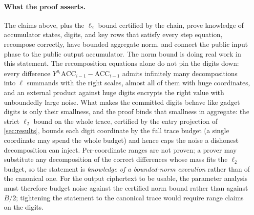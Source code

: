 \documentclass[11pt]{article}
\newcommand{\ACC}{\mathrm{ACC}}
\begin{document}
\paragraph{What the proof asserts.} The claims above, plus the $\ell_2$ bound certified by the chain, prove knowledge of accumulator states, digits, and key rows that satisfy every step equation, recompose correctly, have bounded aggregate norm, and connect the public input phase to the public output accumulator. The norm bound is doing real work in this statement. The recomposition equations alone do not pin the digits down: every difference $Y^{\tilde a_i}\ACC_{i-1} - \ACC_{i-1}$ admits infinitely many decompositions into $\ell$ summands with the right scales, almost all of them with huge coordinates, and an external product against huge digits encrypts the right value with unboundedly large noise. What makes the committed digits behave like gadget digits is only their smallness, and the proof binds that smallness in aggregate: the strict $\ell_2$ bound on the whole trace, certified by the entry projection of \cref{sec:results}, bounds each digit coordinate by the full trace budget (a single coordinate may spend the whole budget) and hence caps the noise a dishonest decomposition can inject. Per-coordinate ranges are not proven; a prover may substitute any decomposition of the correct differences whose mass fits the $\ell_2$ budget, so the statement is \emph{knowledge of a bounded-norm execution} rather than of the canonical one. For the output ciphertext to be usable, the parameter analysis must therefore budget noise against the certified norm bound rather than against $B/2$; tightening the statement to the canonical trace would require range claims on the digits.
\end{document}
